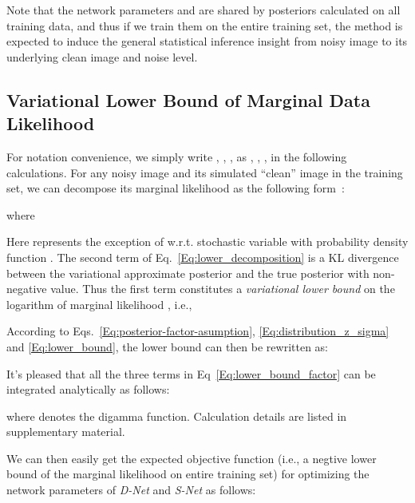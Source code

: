 \documentclass{article}
\begin{document}
Note that the network parameters  and  are shared by posteriors calculated on all training data, and
thus if we train them on the entire training set, the method is expected to induce the general statistical inference
insight from noisy image to its underlying clean image and noise level.

\vspace{-2mm}\subsection{Variational Lower Bound of Marginal Data Likelihood}\vspace{-2mm}
For notation convenience, we simply write , ,
,  as , , ,  in
the following calculations. For any noisy image  and its simulated ``clean'' image  in the
training set, we can decompose its marginal likelihood as the following form~\cite{blei2006variational}:

where

Here  represents the exception of  w.r.t. stochastic variable  with probability density
function . The second term of Eq.~\eqref{Eq:lower_decomposition} is a KL divergence between the variational
approximate posterior  and the true posterior  with
non-negative value. Thus the first term  constitutes a
\textit{variational lower bound} on the logarithm of marginal likelihood , i.e.,

According to Eqs.~\eqref{Eq:posterior-factor-asumption}, \eqref{Eq:distribution_z_sigma} and \eqref{Eq:lower_bound}, the
lower bound can then be rewritten as:

It's pleased that all the three terms in Eq~\eqref{Eq:lower_bound_factor} can be integrated
analytically as follows:
\begin{footnotesize}



\end{footnotesize}
where  denotes the digamma function. Calculation details are listed in supplementary material.

We can then easily get the expected objective function (i.e., a negtive lower bound of the marginal likelihood on
entire training set) for optimizing the network parameters of \textit{D-Net} and \textit{S-Net} as follows:
\end{document}
